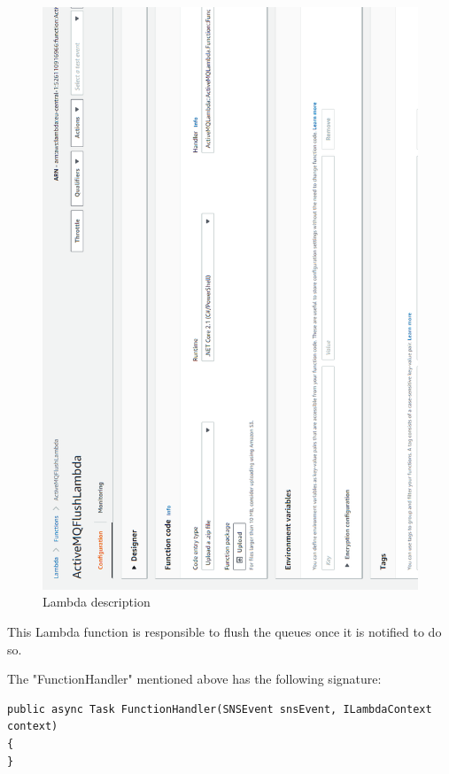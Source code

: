 \begin{figure}[p]
	\centering
	\noindent
	\includegraphics[width=0.5\paperwidth]{./images/aws_resources/AWSLambda.PNG}
	\caption{Lambda description}
	\label{fig:awsLambda}
\end{figure}

This Lambda function is responsible to flush the queues once it is notified to do so.

The "FunctionHandler" mentioned above has the following signature:

\begin{lstlisting}
public async Task FunctionHandler(SNSEvent snsEvent, ILambdaContext context)
{
}
\end{lstlisting}

